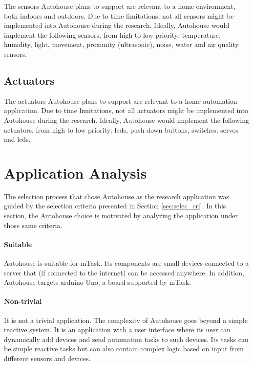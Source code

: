 The sensors Autohouse plans to support are relevant to a home environment, both indoors and outdoors. Due to time limitations, not all sensors might be implemented into Autohouse during the research. Ideally, Autohouse would implement the following sensors, from high to low priority: temperature, humidity, light, movement, proximity (ultrasonic), noise, water and air quality sensors. 

\subsection{Actuators}

The actuators Autohouse plans to support are relevant to a home automation application. Due to time limitations, not all actuators might be implemented into Autohouse during the research. Ideally, Autohouse would implement the following actuators, from high to low priority: \acsp{led}, push down buttons, switches, servos and \acsp{lcd}.

\section{Application Analysis}\label{sec:app_analysis}

The selection process that chose Autohouse as the research application was guided by the selection criteria presented in Section \ref{sec:selec_cri}. In this section, the Autohouse choice is motivated by analyzing the application under those same criteria.

\paragraph{Suitable} Autohouse is suitable for \gls{mTask}. Its components are small devices connected to a server that (if connected to the internet) can be accessed anywhere. In addition, Autohouse targets \gls{arduino} Uno, a board supported by \gls{mTask}.

\paragraph{Non-trivial} It is not a trivial application. The complexity of Autohouse goes beyond a simple reactive system. It is an application with a user interface where its user can dynamically add devices and send automation tasks to such devices. Its tasks can be simple reactive tasks but can also contain complex logic based on input from different sensors and devices.

